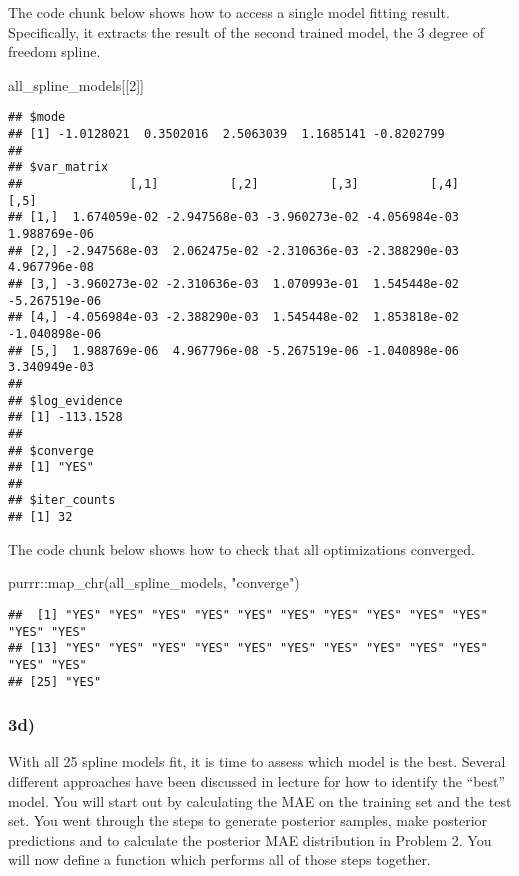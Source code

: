 \documentclass[
]{article}
\newenvironment{Shaded}{\begin{snugshade}}{\end{snugshade}}
\newcommand{\DecValTok}[1]{\textcolor[rgb]{0.00,0.00,0.81}{#1}}
\newcommand{\FunctionTok}[1]{\textcolor[rgb]{0.00,0.00,0.00}{#1}}
\newcommand{\NormalTok}[1]{#1}
\newcommand{\SpecialCharTok}[1]{\textcolor[rgb]{0.00,0.00,0.00}{#1}}
\newcommand{\StringTok}[1]{\textcolor[rgb]{0.31,0.60,0.02}{#1}}
\begin{document}
The code chunk below shows how to access a single model fitting result.
Specifically, it extracts the result of the second trained model, the 3
degree of freedom spline.

\begin{Shaded}
\begin{Highlighting}[]
\NormalTok{all\_spline\_models[[}\DecValTok{2}\NormalTok{]]}
\end{Highlighting}
\end{Shaded}

\begin{verbatim}
## $mode
## [1] -1.0128021  0.3502016  2.5063039  1.1685141 -0.8202799
## 
## $var_matrix
##               [,1]          [,2]          [,3]          [,4]          [,5]
## [1,]  1.674059e-02 -2.947568e-03 -3.960273e-02 -4.056984e-03  1.988769e-06
## [2,] -2.947568e-03  2.062475e-02 -2.310636e-03 -2.388290e-03  4.967796e-08
## [3,] -3.960273e-02 -2.310636e-03  1.070993e-01  1.545448e-02 -5.267519e-06
## [4,] -4.056984e-03 -2.388290e-03  1.545448e-02  1.853818e-02 -1.040898e-06
## [5,]  1.988769e-06  4.967796e-08 -5.267519e-06 -1.040898e-06  3.340949e-03
## 
## $log_evidence
## [1] -113.1528
## 
## $converge
## [1] "YES"
## 
## $iter_counts
## [1] 32
\end{verbatim}

The code chunk below shows how to check that all optimizations
converged.

\begin{Shaded}
\begin{Highlighting}[]
\NormalTok{purrr}\SpecialCharTok{::}\FunctionTok{map\_chr}\NormalTok{(all\_spline\_models, }\StringTok{"converge"}\NormalTok{)}
\end{Highlighting}
\end{Shaded}

\begin{verbatim}
##  [1] "YES" "YES" "YES" "YES" "YES" "YES" "YES" "YES" "YES" "YES" "YES" "YES"
## [13] "YES" "YES" "YES" "YES" "YES" "YES" "YES" "YES" "YES" "YES" "YES" "YES"
## [25] "YES"
\end{verbatim}

\hypertarget{d-2}{%
\subsubsection{3d)}\label{d-2}}

With all 25 spline models fit, it is time to assess which model is the
best. Several different approaches have been discussed in lecture for
how to identify the ``best'' model. You will start out by calculating
the MAE on the training set and the test set. You went through the steps
to generate posterior samples, make posterior predictions and to
calculate the posterior MAE distribution in Problem 2. You will now
define a function which performs all of those steps together.
\end{document}

